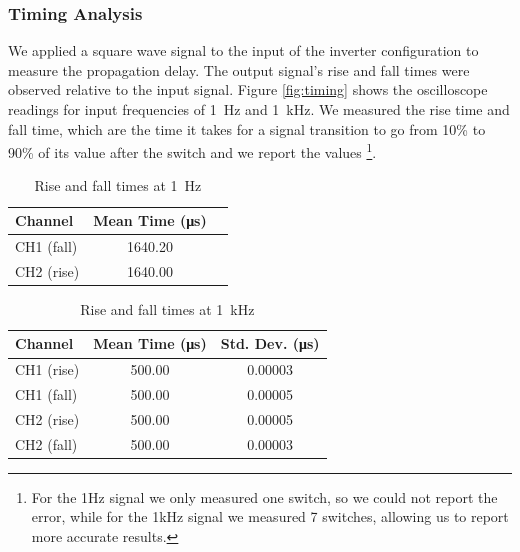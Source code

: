 \documentclass[12pt,a4paper]{article}
\begin{document}
\subsubsection{Timing Analysis}
We applied a square wave signal to the input of the inverter configuration to measure the propagation delay. The output signal's rise and fall times were observed relative to the input signal. Figure \ref{fig:timing} shows the oscilloscope readings for input frequencies of \SI{1}{\hertz} and \SI{1}{\kilo\hertz}. We measured the rise time and fall time, which are the time it takes for a signal transition to go from 10\% to 90\% of its value after the switch and we report the values \footnote{For the 1Hz signal we only measured one switch, so we could not report the error, while for the 1kHz signal we measured 7 switches, allowing us to report more accurate results.}. 


\begin{table}[H]
    \centering
    \caption{Rise and fall times at \SI{1}{\hertz}}
    \begin{tabular}{lcc}
        \toprule
        Channel & Mean Time (\si{\micro\second}) \\
        \midrule
        CH1 (fall) & 1640.20 \\
        CH2 (rise) & 1640.00 \\
        \bottomrule
    \end{tabular}
\end{table}

\begin{table}[H]
    \centering
    \caption{Rise and fall times at \SI{1}{\kilo\hertz}}
    \begin{tabular}{lcc}
        \toprule
        Channel & Mean Time (\si{\micro\second}) & Std. Dev. (\si{\micro\second}) \\
        \midrule
        CH1 (rise) & 500.00 & 0.00003 \\
        CH1 (fall) & 500.00 & 0.00005 \\
        CH2 (rise) & 500.00 & 0.00005 \\
        CH2 (fall) & 500.00 & 0.00003 \\
        \bottomrule
    \end{tabular}
\end{table}
\end{document}
